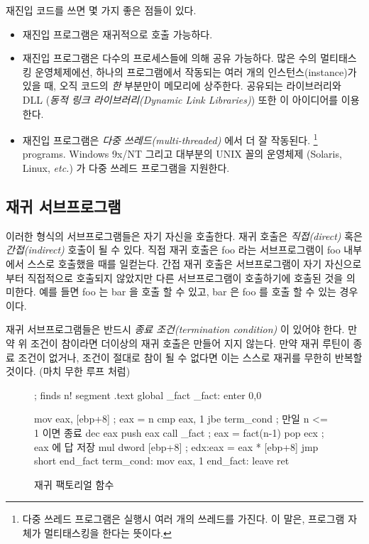 재진입 코드를 쓰면 몇 가지 좋은 점들이 있다. 

\begin{itemize}
\item 재진입 프로그램은 재귀적으로 호출 가능하다.
\item
재진입 프로그램은 다수의 프로세스들에 의해 공유 가능하다. 많은 수의 
멀티태스킹 운영체제에선, 하나의 프로그램에서 작동되는 여러 개의 인스턴스(instance)가
있을 때, 오직 코드의 \emph{한} 부분만이 메모리에 상주한다. 공유되는 
라이브러리와 DLL (\emph{동적 링크 라이브러리(Dynamic Link Libraries)}) 또한
이 아이디어를 이용한다. 
\item 재진입 프로그램은 \emph{다중 쓰레드(multi-threaded)} 에서 더 잘 작동된다. 
\footnote{다중 쓰레드 프로그램은 실행시 여러 개의 쓰레드를 가진다. 이 말은, 
프로그램 자체가 멀티태스킹을 한다는 뜻이다.} pro\-grams. Windows 9x/NT 그리고
대부분의 UNIX 꼴의 운영체제 (Solaris, Linux, \emph{etc.}) 가 다중 쓰레드 프로그램을
지원한다. 


\end{itemize}

\subsection{재귀 서브프로그램}

이러한 형식의 서브프로그램들은 자기 자신을 호출한다. 재귀 호출은 
\emph{직접(direct)} 혹은 \emph{간접(indirect)} 호출이 될 수 있다. 직접
재귀 호출은 {\code foo} 라는 서브프로그램이 {\code foo} 내부에서
스스로 호출했을 때를 일컫는다. 간접 재귀 호출은 서브프로그램이 자기
자신으로 부터 직접적으로 호출되지 않았지만 다른 서브프로그램이 호출하기에 
호출된 것을 의미한다. 예를 들면 {\code foo} 는 {\code bar} 을 호출 할 수 있고,
{\code bar} 은 {\code foo} 를 호출 할 수 있는 경우 이다. 

재귀 서브프로그램들은 반드시 \emph{종료 조건(termination condition)} 
이 있어야 한다. 만약 위 조건이 참이라면 더이상의 재귀 호출은 만들어
지지 않는다. 만약 재귀 루틴이 종료 조건이 없거나, 조건이 절대로 참이 
될 수 없다면 이는 스스로 재귀를 무한히 반복할 것이다. (마치 무한 루프 처럼)

\begin{figure}
\begin{AsmCodeListing}[frame=single]
; finds n!
segment .text
      global _fact
_fact:
      enter  0,0

      mov    eax, [ebp+8]    ; eax = n
      cmp    eax, 1
      jbe    term_cond       ; 만일 n <= 1 이면 종료
      dec    eax
      push   eax
      call   _fact           ; eax = fact(n-1)
      pop    ecx             ; eax 에 답 저장
      mul    dword [ebp+8]   ; edx:eax = eax * [ebp+8]
      jmp    short end_fact
term_cond:
      mov    eax, 1
end_fact:
      leave
      ret
\end{AsmCodeListing}
\caption{재귀 팩토리얼 함수\label{fig:factorial}}
\end{figure}

